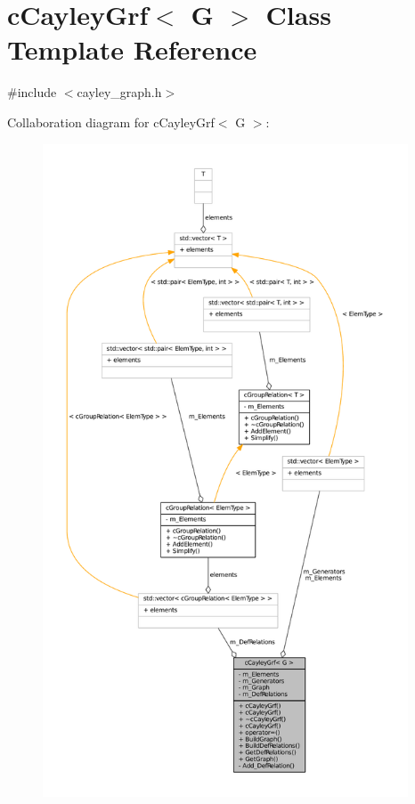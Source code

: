 \hypertarget{classcCayleyGrf}{\section{c\-Cayley\-Grf$<$ \-G $>$ \-Class \-Template \-Reference}
\label{classcCayleyGrf}
}


{\ttfamily \#include $<$cayley\-\_\-graph.\-h$>$}



\-Collaboration diagram for c\-Cayley\-Grf$<$ \-G $>$\-:
\nopagebreak
\begin{figure}[H]
\begin{center}
\leavevmode
\includegraphics[height=550pt]{classcCayleyGrf__coll__graph}
\end{center}
\end{figure}

